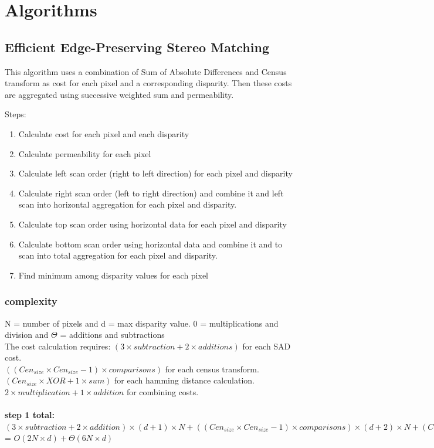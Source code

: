 \chapter{Algorithms}

\section{Efficient Edge-Preserving Stereo Matching}

This algorithm uses a combination of Sum of Absolute Differences and Census transform as cost for each pixel and a corresponding disparity. Then these costs are aggregated using successive weighted sum and permeability.

Steps:
\begin{enumerate}
\item Calculate cost for each pixel and each disparity
\item Calculate permeability for each pixel
\item Calculate left scan order (right to left direction) for each pixel and disparity
\item Calculate right scan order (left to right direction) and combine it and left scan into horizontal aggregation for each pixel and disparity.
\item Calculate top scan order using horizontal data for each pixel and disparity
\item Calculate bottom scan order using horizontal data and combine it and to scan into total aggregation for each pixel and disparity. 
\item Find minimum among disparity values for each pixel
\end{enumerate}

\subsection*{complexity}
N = number of pixels and d = max disparity value. $0$ = multiplications and division and $\Theta$ = additions and subtractions\\
The cost calculation requires: $(3 \times subtraction + 2 \times additions)$ for each SAD cost.\\
$((Cen_{size}\times Cen_{size} - 1) \times comparisons)$ for each census transform.\\
$(Cen_{size} \times XOR + 1 \times sum)$ for each hamming distance calculation.\\
$2 \times multiplication + 1 \times addition$ for combining costs. \\~\\
\textbf{step 1 total:} $(3\times subtraction + 2 \times addition) \times (d+1) \times N + ((Cen_{size}\times Cen_{size} - 1) \times comparisons) \times (d+2) \times N + (Cen_{size} \times XOR + 1 \times sum) \times (d+1) \times N + (2 \times multiplication + 1 \times addition) \times (d+1) \times N$\\
= $O(2N \times d) + \Theta(6N \times d)$\\~\\

